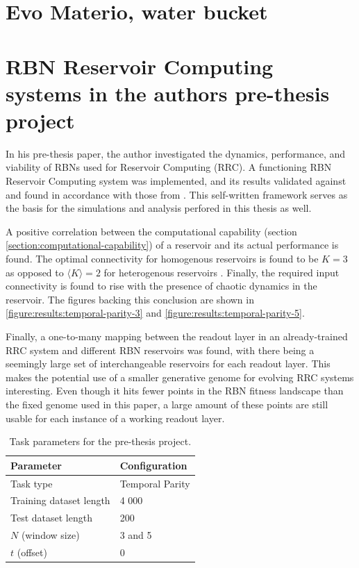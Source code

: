 \section{Evo Materio, water bucket}

\section{RBN Reservoir Computing systems in the authors pre-thesis project}
\label{section:pre-thesis-project}

In his pre-thesis paper, the author investigated the dynamics, performance, and viability of RBNs used for Reservoir Computing (RRC).
A functioning RBN Reservoir Computing system was implemented,
and its results validated against and found in accordance with those from \cite{rbn-reservoir}.
This self-written framework serves as the basis for the simulations and analysis perfored in this thesis as well.

A positive correlation between the computational capability (section \ref{section:computational-capability}) of a reservoir and its actual performance is found.
The optimal connectivity for homogenous reservoirs is found to be $K=3$ as opposed to $\langle K \rangle = 2$ for heterogenous reservoirs \cite{rbn-reservoir}.
Finally, the required input connectivity is found to rise with the presence of chaotic dynamics in the reservoir.
The figures backing this conclusion are shown in \ref{figure:results:temporal-parity-3} and \ref{figure:results:temporal-parity-5}.

Finally, a one-to-many mapping between the readout layer in an already-trained RRC system and different RBN reservoirs was found,
with there being a seemingly large set of interchangeable reservoirs for each readout layer.
This makes the potential use of a smaller generative genome for evolving RRC systems interesting.
Even though it hits fewer points in the RBN fitness landscape than the fixed genome used in this paper,
a large amount of these points are still usable for each instance of a working readout layer.

\begin{table}[ht]
    \centering
    \caption{Task parameters for the pre-thesis project.}
    \label{table:pre-thesis-tasks}
    \begin{tabular}{ll}
        \hline
        \textbf{Parameter} & \textbf{Configuration} \\
        \hline
        \hline
        Task type               & Temporal Parity \\
        Training dataset length & 4 000                       \\
        Test dataset length     & 200                         \\
        $N$ (window size)       & 3 and 5                     \\
        $t$ (offset)            & 0 \\
        \hline
    \end{tabular}
\end{table}

